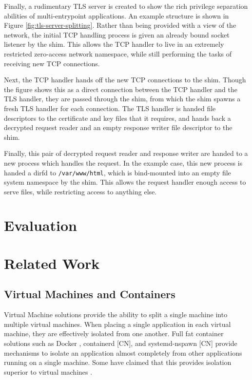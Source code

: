 \documentclass[sigplan]{acmart}
\begin{document}
Finally, a rudimentary TLS server is created to show the rich privilege separation abilities of multi-entrypoint applications. An example structure is shown in Figure \ref{fig:tls-server-splitting}. Rather than being provided with a view of the network, the initial TCP handling process is given an already bound socket listener by the shim. This allows the TCP handler to live in an extremely restricted zero-access network namespace, while still performing the tasks of receiving new TCP connections.

Next, the TCP handler hands off the new TCP connections to the shim. Though the figure shows this as a direct connection between the TCP handler and the TLS handler, they are passed through the shim, from which the shim spawns a fresh TLS handler for each connection. The TLS handler is handed file descriptors to the certificate and key files that it requires, and hands back a decrypted request reader and an empty response writer file descriptor to the shim.

Finally, this pair of decrypted request reader and response writer are handed to a new process which handles the request. In the example case, this new process is handed a dirfd to \texttt{/var/www/html}, which is bind-mounted into an empty file system namespace by the shim. This allows the request handler enough access to serve files, while restricting access to anything else.


\section{Evaluation}



\section{Related Work}

\subsection{Virtual Machines and Containers}

Virtual Machine solutions \citep{barham_xen_2003,vmware_inc_understanding_2008} provide the ability to split a single machine into multiple virtual machines. When placing a single application in each virtual machine, they are effectively isolated from one another. Full fat container solutions such as Docker \citep{merkel_docker_2014}, containerd [CN], and systemd-nspawn [CN] provide mechanisms to isolate an application almost completely from other applications running on a single machine. Some have claimed that this provides isolation superior to virtual machines \citep{soltesz_container-based_2007}.
\end{document}
